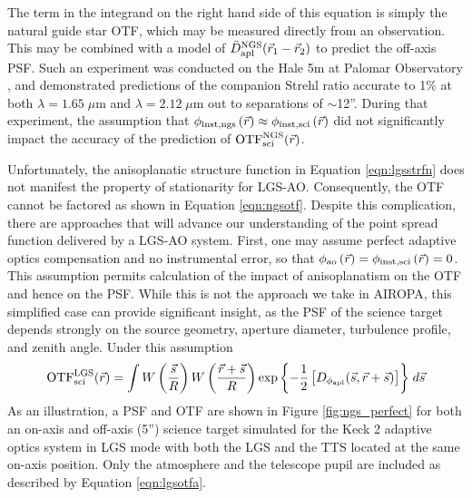 The term in the integrand on the right hand side of this equation is
simply the natural guide star OTF, which may be measured
directly from an observation.  This may be combined with a model of
$\bar{D}^{\rm NGS}_{\rm apl}(\vec{r}_{1} - \vec{r}_{2})$ to
predict the off-axis PSF.  Such an experiment was
conducted on the Hale 5m at Palomar Observatory
\cite{Britton:2006}, and demonstrated predictions of the
companion Strehl ratio accurate to 1\% at both $\lambda=1.65\;\mu$m and
$\lambda=2.12\;\mu$m out to separations of $\sim$12''.
During that experiment, the
assumption that $\phi_{\rm inst,ngs}\left(\vec{r}\right) \approx
\phi_{\rm inst,sci}\left(\vec{r}\right)$ did not significantly
impact the accuracy of the prediction of ${\rm OTF}^{\rm NGS}_{\rm
  sci}(\vec{r})$. 

Unfortunately, the anisoplanatic structure function in Equation
\ref{eqn:lgsstrfn} does not manifest the property of stationarity for LGS-AO.  
Consequently, the OTF cannot be factored as shown in Equation
\ref{eqn:ngsotf}.  Despite this complication, there are approaches that
will advance our understanding of the point spread function delivered
by a LGS-AO system.  First, one may assume
perfect adaptive optics compensation and no instrumental error, so
that $\phi_{\rm ao}\left(\vec{r}\right) = 
\phi_{\rm inst,sci}\left(\vec{r}\right) = 0$.  This assumption permits
calculation of the impact of anisoplanatism on the OTF 
and hence on the PSF. While this is not the approach we take in 
AIROPA, this simplified case
can provide significant insight, as the PSF of the science target depends
strongly on the source geometry, aperture diameter, turbulence
profile, and zenith angle.  Under this assumption
\begin{equation}\label{eqn:lgsotfa}
\begin{aligned}
{\rm OTF}^{\rm LGS}_{\rm sci}(\vec{r}) = 
\int 
W \left( \frac{\vec{s}}{R} \right)
W \left( \frac{\vec{r} + \vec{s}}{R} \right) 
\exp{\left\{ -\frac{1}{2} \left[
D_{\rm \phi_{apl}}(\vec{s}, \vec{r} + \vec{s})
\right] \right\}}
\; d\vec{s} 
\end{aligned}
\end{equation}
As an illustration, a PSF and OTF are shown in Figure
\ref{fig:ngs_perfect} for both an on-axis and off-axis (5'') science
target simulated for the Keck 2 adaptive optics system in LGS mode
with both the LGS and the TTS located at the same on-axis position. 
Only the atmosphere and the telescope pupil are included as described
by Equation \ref{eqn:lgsotfa}. 